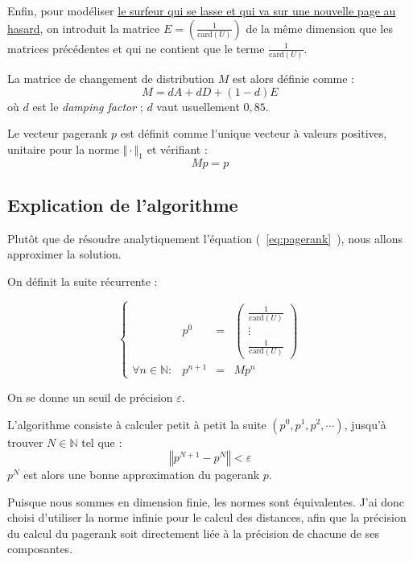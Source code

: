 \documentclass[a4paper,12pt]{article}
\begin{document}
Enfin, pour modéliser \ul{le surfeur qui se lasse et qui va sur une nouvelle page au hasard}, on introduit la matrice $E = ( \frac{1}{\text{card}(U)} )$ de la même dimension que les matrices précédentes et qui ne contient que le terme $\frac{1}{\text{card}(U)}$.

\bigskip

La matrice de changement de distribution $M$ est alors définie comme :
$$ M = dA + dD + (1-d)E $$
où $d$ est le \textit{damping factor} ; $d$ vaut usuellement $0,85$.

\bigskip

Le vecteur pagerank $p$ est définit comme l'unique vecteur à valeurs positives, unitaire pour la norme $\Vert \cdot \Vert _1$ et vérifiant : 
\begin{equation}
  Mp = p
  \label{eq:pagerank}
\end{equation}

\subsection{Explication de l'algorithme}

Plutôt que de résoudre analytiquement l'équation (~\ref{eq:pagerank}~), nous allons approximer la solution.

\bigskip

On définit la suite récurrente :

$$
\left\{
\begin{array}{llcl}
   & p^0 & = & \begin{pmatrix}
     \frac{1}{\text{card}(U)} \\
     \vdots \\
     \frac{1}{\text{card}(U)}
   \end{pmatrix}\\
  \forall n \in \mathds{N} : & p^{n+1} & = & M p^n 
\end{array}
\right.
$$

On se donne un seuil de précision $\varepsilon$.

\bigskip

L'algorithme consiste à calculer petit à petit la suite $(p^0, p^1, p^2, \cdots )$, jusqu'à trouver $N \in \mathds{N}$ tel que :
$$ \left\Vert p^{N+1} - p^N \right\Vert < \varepsilon $$ 
$p^N$ est alors une bonne approximation du pagerank $p$.

\bigskip

Puisque nous sommes en dimension finie, les normes sont équivalentes.
J'ai donc choisi d'utiliser la norme infinie pour le calcul des distances, afin que la précision du calcul du pagerank soit directement liée à la précision de chacune de ses composantes.
\end{document}

